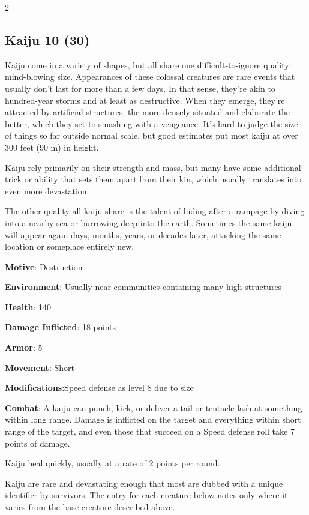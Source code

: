 \begin{multicols}{2}
\subsection{Kaiju	10 (30)}

Kaiju come in a variety of shapes, but all share one difficult-to-ignore quality: mind-blowing size. Appearances of these colossal creatures are rare events that usually don’t last for more than a few days. In that sense, they’re akin to hundred-year storms and at least as destructive. When they emerge, they’re attracted by artificial structures, the more densely situated and elaborate the better, which they set to smashing with a vengeance. It’s hard to judge the size of things so far outside normal scale, but good estimates put most kaiju at over 300 feet (90 m) in height.

Kaiju rely primarily on their strength and mass, but many have some additional trick or ability that sets them apart from their kin, which usually translates into even more devastation.

The other quality all kaiju share is the talent of hiding after a rampage by diving into a nearby sea or burrowing deep into the earth. Sometimes the same kaiju will appear again days, months, years, or decades later, attacking the same location or someplace entirely new.

\textbf{Motive}: Destruction

\textbf{Environment}: Usually near communities containing many high structures

\textbf{Health}: 140

\textbf{Damage Inflicted}: 18 points

\textbf{Armor}: 5

\textbf{Movement}: Short

\textbf{Modifications}:Speed defense as level 8 due to size

\textbf{Combat}: A kaiju can punch, kick, or deliver a tail or tentacle lash at something within long range. Damage is inflicted on the target and everything within short range of the target, and even those that succeed on a Speed defense roll take 7 points of damage.

Kaiju heal quickly, usually at a rate of 2 points per round.

Kaiju are rare and devastating enough that most are dubbed with a unique identifier by survivors. The entry for each creature below notes only where it varies from the base creature described above.


\end{multicols}
